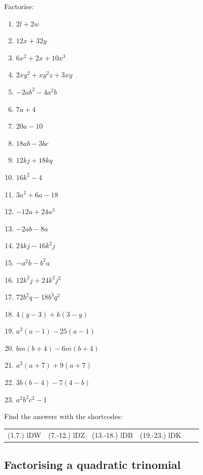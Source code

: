 \begin{exercises}{}{
Factorise:
\begin{multicols}{2}
\begin{enumerate}[itemsep=5pt, label=\textbf{\arabic*}. ] 
\item $2l+2w$
\item $12x+32y$
\item $6{x}^{2}+2x+10{x}^{3}$
\item $2x{y}^{2}+x{y}^{2}z+3xy$
\item $-2a{b}^{2}-4{a}^{2}b$
\item $7a+4$ 
\item $20a-10$ 
\item $18ab-3bc$
\item $12kj+18kq$ 
\item $16{k}^{2}-4$ 
\item $3{a}^{2}+6a-18$
\item $-12a+24a^3$ 
\item $-2ab-8a$ 
\item $24kj-16{k}^{2}j$
\item $-{a}^{2}b-{b}^{2}a$ 
\item $12{k}^{2}j+24{k}^{2}{j}^{2}$ 
\item $72{b}^{2}q-18{b}^{3}{q}^{2}$
\item $4(y-3)+k(3-y)$ 
\item $a^2(a-1)-25(a-1)$ 
\item $bm(b+4)-6m(b+4)$
\item ${a}^{2}(a+7)+9(a+7)$ 
\item $3b(b-4)-7(4-b)$ 
\item ${a}^{2}{b}^{2}{c}^{2}-1$
\end{enumerate}
\end{multicols}
\practiceinfo 
\par {} Find the answers with the shortcodes:
 \par \begin{tabular}[h]{cccccc}
 (1.7.) lDW  &  (7.-12.) lDZ  & (13.-18.) lDB  &  (19.-23.) lDK    \end{tabular}
}
\end{exercises}



\subsection* {Factorising a quadratic trinomial }

